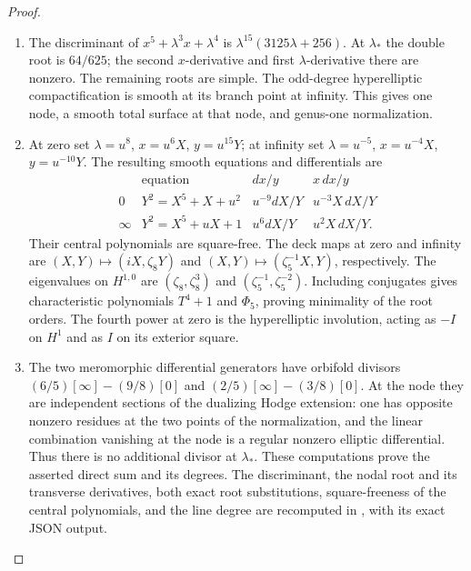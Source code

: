 \begin{proof}
\begin{enumerate}[label=\arabic*.]
\item The discriminant of $x^5+\lambda^3x+\lambda^4$ is
$\lambda^{15}(3125\lambda+256)$.
At $\lambda_*$ the double root is $64/625$;
the second $x$-derivative and first $\lambda$-derivative there are
nonzero.  The remaining roots are simple.  The odd-degree
hyperelliptic compactification is smooth at its branch point at
infinity.  This gives one node, a smooth total surface at that node,
and genus-one normalization.

\item At zero set $\lambda=u^8$, $x=u^6X$, $y=u^{15}Y$; at infinity set
$\lambda=u^{-5}$, $x=u^{-4}X$, $y=u^{-10}Y$.
The resulting smooth equations and differentials are
\[
\begin{array}{c|c|c|c}
 &\text{equation}&dx/y&x\,dx/y\\\hline
0&Y^2=X^5+X+u^2&u^{-9}dX/Y&u^{-3}X\,dX/Y\\
\infty&Y^2=X^5+uX+1&u^6dX/Y&u^2X\,dX/Y.
\end{array}
\]
Their central polynomials are square-free.  The deck maps at zero and
infinity are $(X,Y)\mapsto(iX,\zeta_8Y)$ and
$(X,Y)\mapsto(\zeta_5^{-1}X,Y)$, respectively.
The eigenvalues on $H^{1,0}$ are $(\zeta_8,\zeta_8^3)$ and
$(\zeta_5^{-1},\zeta_5^{-2})$.  Including conjugates gives characteristic
polynomials $T^4+1$ and $\Phi_5$, proving minimality of the root orders.
The fourth power at zero is the hyperelliptic involution, acting as
$-I$ on $H^1$ and as $I$ on its exterior square.

\item The two meromorphic differential generators have orbifold divisors
$(6/5)[\infty]-(9/8)[0]$ and
$(2/5)[\infty]-(3/8)[0]$.
At the node they are independent sections of the dualizing Hodge
extension: one has opposite nonzero residues at the two points of the
normalization, and the linear combination vanishing at the node is a
regular nonzero elliptic differential.  Thus there is no additional
divisor at $\lambda_*$.  These computations prove the asserted direct
sum and its degrees.  The discriminant, the nodal root and its transverse derivatives,
both exact root substitutions, square-freeness of the central polynomials,
and the line degree are recomputed in
, with its exact JSON output.

\end{enumerate}
\end{proof}
